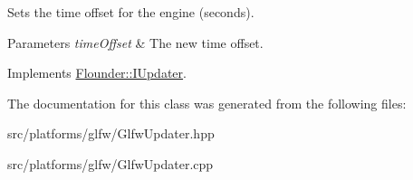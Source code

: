 Sets the time offset for the engine (seconds). 


\begin{DoxyParams}{Parameters}
{\em time\+Offset} & The new time offset. \\
\hline
\end{DoxyParams}


Implements \hyperlink{class_flounder_1_1_i_updater_a810d7c8481aacd2a1061f540683c3beb}{Flounder\+::\+I\+Updater}.



The documentation for this class was generated from the following files\+:\begin{DoxyCompactItemize}
\item 
src/platforms/glfw/Glfw\+Updater.\+hpp\item 
src/platforms/glfw/Glfw\+Updater.\+cpp\end{DoxyCompactItemize}
